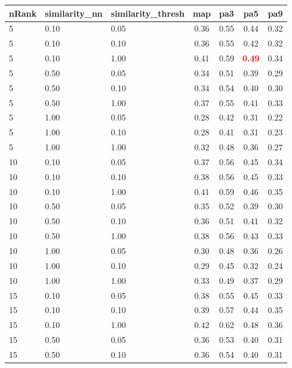 \documentclass[12pt,a4paper,fleqn]{tufte-handout}
\begin{document}
 
\begin{table}         
\begin{center}         
\scriptsize         
\setlength{\tabcolsep}{.16667em}         
\begin{tabular}{lllcccc}         
nRank & similarity\_nn & similarity\_thresh & map & pa3 & pa5 & pa9 \\         
\hline         
5 & 0.10 & 0.05 & 0.36 & 0.55 & 0.44 & 0.32 \\         
5 & 0.10 & 0.10 & 0.36 & 0.55 & 0.42 & 0.32 \\         
5 & 0.10 & 1.00 & 0.41 & 0.59 & \textbf{\textcolor{red}{0.49}} & 0.34 \\         
5 & 0.50 & 0.05 & 0.34 & 0.51 & 0.39 & 0.29 \\         
5 & 0.50 & 0.10 & 0.34 & 0.54 & 0.40 & 0.30 \\         
5 & 0.50 & 1.00 & 0.37 & 0.55 & 0.41 & 0.33 \\         
5 & 1.00 & 0.05 & 0.28 & 0.42 & 0.31 & 0.22 \\         
5 & 1.00 & 0.10 & 0.28 & 0.41 & 0.31 & 0.23 \\         
5 & 1.00 & 1.00 & 0.32 & 0.48 & 0.36 & 0.27 \\         
10 & 0.10 & 0.05 & 0.37 & 0.56 & 0.45 & 0.34 \\         
10 & 0.10 & 0.10 & 0.38 & 0.56 & 0.45 & 0.33 \\         
10 & 0.10 & 1.00 & 0.41 & 0.59 & 0.46 & 0.35 \\         
10 & 0.50 & 0.05 & 0.35 & 0.52 & 0.39 & 0.30 \\         
10 & 0.50 & 0.10 & 0.36 & 0.51 & 0.41 & 0.32 \\         
10 & 0.50 & 1.00 & 0.38 & 0.56 & 0.43 & 0.33 \\         
10 & 1.00 & 0.05 & 0.30 & 0.48 & 0.36 & 0.26 \\         
10 & 1.00 & 0.10 & 0.29 & 0.45 & 0.32 & 0.24 \\         
10 & 1.00 & 1.00 & 0.33 & 0.49 & 0.37 & 0.29 \\         
15 & 0.10 & 0.05 & 0.38 & 0.55 & 0.45 & 0.33 \\         
15 & 0.10 & 0.10 & 0.39 & 0.57 & 0.44 & 0.35 \\         
15 & 0.10 & 1.00 & 0.42 & 0.62 & 0.48 & 0.36 \\         
15 & 0.50 & 0.05 & 0.36 & 0.53 & 0.40 & 0.31 \\         
15 & 0.50 & 0.10 & 0.36 & 0.54 & 0.40 & 0.31 \\         

\end{tabular}
\end{center}
\end{table}
\end{document}
